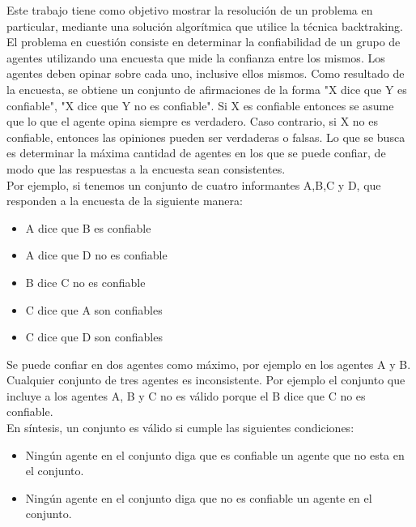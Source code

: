 \documentclass{article}
\begin{document}
Este trabajo tiene como objetivo mostrar la resolución de un problema en particular, mediante una solución algorítmica que utilice la técnica backtraking.
El problema en cuestión consiste en determinar la confiabilidad de un grupo de agentes utilizando una encuesta que mide la confianza entre los mismos. Los agentes deben opinar sobre cada uno, inclusive ellos mismos.
Como resultado de la encuesta, se obtiene un conjunto de afirmaciones de la forma "X dice que Y es confiable", "X dice que Y no es confiable". Si X es confiable entonces se asume que lo que el agente opina siempre es verdadero. Caso contrario, si X no es confiable, entonces las opiniones pueden ser verdaderas o falsas. Lo que se busca es determinar la máxima cantidad de agentes en los que se puede confiar, de modo que las respuestas a la encuesta sean consistentes. \\
Por ejemplo, si tenemos un conjunto de cuatro informantes A,B,C y D, que responden a la encuesta de la siguiente manera:
\begin{itemize}
	\item A dice que B es confiable
	\item A dice que D no es confiable
	\item B dice C no es confiable
	\item C dice que A son confiables
	\item C dice que D son confiables
\end{itemize}
Se puede confiar en dos agentes como máximo, por ejemplo en los agentes A y B. Cualquier conjunto de tres agentes es inconsistente. Por ejemplo el conjunto que incluye a los agentes A, B y C no es válido porque el B dice que C no es confiable.\\
En síntesis, un conjunto es válido si cumple las siguientes condiciones:
\begin{itemize}
	\item Ningún agente en el conjunto diga que es confiable un agente que no esta en el conjunto.
	\item Ningún agente en el conjunto diga que no es confiable un agente en el conjunto.
\end{itemize}
\end{document}
